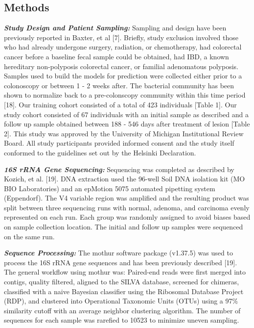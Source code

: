 \documentclass[12pt,]{article}
\begin{document}
\newpage

\subsection{Methods}\label{methods}

\textbf{\emph{Study Design and Patient Sampling:}} Sampling and design
have been previously reported in Baxter, et al {[}7{]}. Briefly, study
exclusion involved those who had already undergone surgery, radiation,
or chemotherapy, had colorectal cancer before a baseline fecal sample
could be obtained, had IBD, a known hereditary non-polyposis colorectal
cancer, or familial adenomatous polyposis. Samples used to build the
models for prediction were collected either prior to a colonoscopy or
between 1 - 2 weeks after. The bacterial community has been shown to
normalize back to a pre-colonscopy community within this time period
{[}18{]}. Our training cohort consisted of a total of 423 individuals
{[}Table 1{]}. Our study cohort consisted of 67 individuals with an
initial sample as described and a follow up sample obtained between 188
- 546 days after treatment of lesion {[}Table 2{]}. This study was
approved by the University of Michigan Institutional Review Board. All
study participants provided informed consent and the study itself
conformed to the guidelines set out by the Helsinki Declaration.

\textbf{\emph{16S rRNA Gene Sequencing:}} Sequencing was completed as
described by Kozich, et al. {[}19{]}. DNA extraction used the 96-well
Soil DNA isolation kit (MO BIO Laboratories) and an epMotion 5075
automated pipetting system (Eppendorf). The V4 variable region was
amplified and the resulting product was split between three sequencing
runs with normal, adenoma, and carcinoma evenly represented on each run.
Each group was randomly assigned to avoid biases based on sample
collection location. The initial and follow up samples were sequenced on
the same run.

\textbf{\emph{Sequence Processing:}} The mothur software package
(v1.37.5) was used to process the 16S rRNA gene sequences and has been
previously described {[}19{]}. The general workflow using mothur was:
Paired-end reads were first merged into contigs, quality filtered,
aligned to the SILVA database, screened for chimeras, classified with a
naive Bayesian classifier using the Ribosomal Database Project (RDP),
and clustered into Operational Taxonomic Units (OTUs) using a 97\%
similarity cutoff with an average neighbor clustering algorithm. The
number of sequences for each sample was rarefied to 10523 to minimize
uneven sampling.
\end{document}
